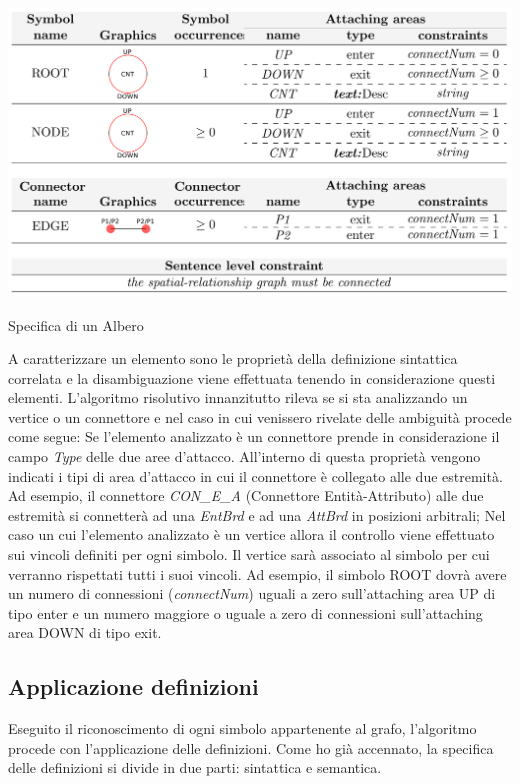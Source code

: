             \begin{table}[htbp]
                \centering
                \includegraphics[scale=0.4]{Figure/final_syntax_definition_tree.PNG}
                \caption{Specifica di un Albero \cite{localcontext}}
                \label{tab:final_syntax_definition_tree}
            \end{table}

            A caratterizzare un elemento sono le proprietà della definizione sintattica correlata e la disambiguazione viene effettuata tenendo in considerazione questi elementi.
            \newline
            L'algoritmo risolutivo innanzitutto rileva se si sta analizzando un vertice o un connettore e nel caso in cui venissero rivelate delle ambiguità procede come segue: Se l'elemento analizzato è un connettore prende in considerazione il campo \textit{Type} delle due aree d'attacco. All'interno di questa proprietà vengono indicati i tipi di area d'attacco in cui il connettore è collegato alle due estremità. Ad esempio, il connettore \textit{CON\_E\_A} (Connettore Entità-Attributo) alle due estremità si connetterà ad una \textit{EntBrd} e ad una \textit{AttBrd} in posizioni arbitrali; Nel caso un cui l'elemento analizzato è un vertice allora il controllo viene effettuato sui vincoli definiti per ogni simbolo. Il vertice sarà associato al simbolo per cui verranno rispettati tutti i suoi vincoli. Ad esempio, il simbolo ROOT dovrà avere un numero di connessioni (\textit{connectNum}) uguali a zero sull'attaching area UP di tipo enter e un numero maggiore o uguale a zero di connessioni sull'attaching area DOWN di tipo exit.
            \newline

        \subsection{Applicazione definizioni}
            Eseguito il riconoscimento di ogni simbolo appartenente al grafo, l'algoritmo procede con l'applicazione delle definizioni. Come ho già accennato, la specifica delle definizioni si divide in due parti: sintattica e semantica.

